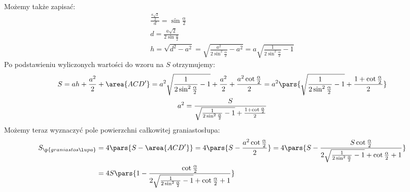 Możemy także zapisać:
\begin{gather*}
    \frac{\frac{a\sqrt{2}}{2}}{d} = \sin\frac{\alpha}{2}\\
    d = \frac{a\sqrt{2}}{2\sin\frac{\alpha}{2}}\\
    h
    = \sqrt{d^2 - a^2}
    = \sqrt{\frac{a^2}{2\sin^2\frac{\alpha}{2}} - a^2}
    = a\sqrt{\frac{1}{2\sin^2\frac{\alpha}{2}} - 1}
\end{gather*}
Po podstawieniu wyliczonych wartości do wzoru na \(S\) otrzymujemy:
\begin{gather*}
    S
    = ah + \frac{a^2}{2} + \area{ACD'}
    = a^2\sqrt{\frac{1}{2\sin^2\frac{\alpha}{2}} - 1} + \frac{a^2}{2} + \frac{a^2\cot\frac{\alpha}{2}}{2}
    = a^2\pars{\sqrt{\frac{1}{2\sin^2\frac{\alpha}{2}} - 1} + \frac{1 + \cot\frac{\alpha}{2}}{2}}\\
    a^2 = \frac{S}{\sqrt{\frac{1}{2\sin^2\frac{\alpha}{2}} - 1} + \frac{1 + \cot\frac{\alpha}{2}}{2}}
\end{gather*}
Możemy teraz wyznaczyć pole powierzchni całkowitej graniastosłupa:
\begin{equation*}
    \begin{split}
        S_\p{graniastosłupa}
        &= 4\pars{S - \area{ACD'}}
        = 4\pars{S - \frac{a^2\cot\frac{\alpha}{2}}{2}}
        = 4\pars{S - \frac{S\cot\frac{\alpha}{2}}{2\sqrt{\frac{1}{2\sin^2\frac{\alpha}{2}} - 1} + \cot\frac{\alpha}{2} + 1}}\\
        &= 4S\pars{1 - \frac{\cot\frac{\alpha}{2}}{2\sqrt{\frac{1}{2\sin^2\frac{\alpha}{2}} - 1} + \cot\frac{\alpha}{2} + 1}}
    \end{split}
\end{equation*}
